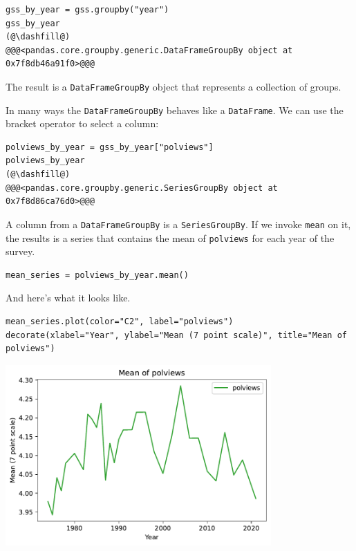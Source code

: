 \begin{lstlisting}[]
gss_by_year = gss.groupby("year")
gss_by_year
(@\dashfill@)
@@@<pandas.core.groupby.generic.DataFrameGroupBy object at 0x7f8db46a91f0>@@@
\end{lstlisting}

The result is a \passthrough{\lstinline!DataFrameGroupBy!} object that
represents a collection of groups.

In many ways the \passthrough{\lstinline!DataFrameGroupBy!} behaves like
a \passthrough{\lstinline!DataFrame!}. We can use the bracket operator
to select a column:

\begin{lstlisting}[]
polviews_by_year = gss_by_year["polviews"]
polviews_by_year
(@\dashfill@)
@@@<pandas.core.groupby.generic.SeriesGroupBy object at 0x7f8d86ca76d0>@@@
\end{lstlisting}

A column from a \passthrough{\lstinline!DataFrameGroupBy!} is a
\passthrough{\lstinline!SeriesGroupBy!}. If we invoke
\passthrough{\lstinline!mean!} on it, the results is a series that
contains the mean of \passthrough{\lstinline!polviews!} for each year of
the survey.

\begin{lstlisting}[]
mean_series = polviews_by_year.mean()
\end{lstlisting}

And here's what it looks like.

\begin{lstlisting}[]
mean_series.plot(color="C2", label="polviews")
decorate(xlabel="Year", ylabel="Mean (7 point scale)", title="Mean of polviews")
\end{lstlisting}

\begin{center}
\includegraphics[width=4in]{chapters/02_polviews_soln_files/02_polviews_soln_50_0.pdf}
\end{center}

